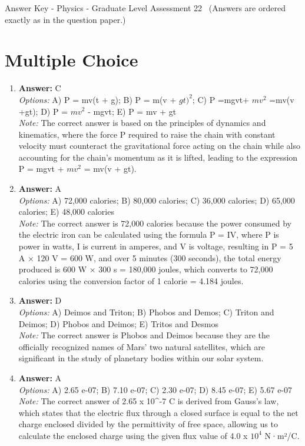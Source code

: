 \documentclass[12pt]{article}
\begin{document}
\begin{center}
Answer Key - Physics - Graduate Level Assessment 22 \
\small (Answers are ordered exactly as in the question paper.)
\end{center}

\section*{Multiple Choice}
\begin{enumerate}[label=\arabic*.]
\item \textbf{Answer:} C
\\ \textit{Options:} A) P = mv(t + g); B) P = m(v + $gt)^2$; C) P =mgvt+ $mv^2$ =mv(v +gt); D) P = $mv^2$ - mgvt; E) P = mv + gt
\\ \textit{Note:} The correct answer is based on the principles of dynamics and kinematics, where the force P required to raise the chain with constant velocity must counteract the gravitational force acting on the chain while also accounting for the chain's momentum as it is lifted, leading to the expression P = mgvt + $mv^2$ = mv(v + gt).
\item \textbf{Answer:} A
\\ \textit{Options:} A) 72,000 calories; B) 80,000 calories; C) 36,000 calories; D) 65,000 calories; E) 48,000 calories
\\ \textit{Note:} The correct answer is 72,000 calories because the power consumed by the electric iron can be calculated using the formula P = IV, where P is power in watts, I is current in amperes, and V is voltage, resulting in P = 5 A × 120 V = 600 W, and over 5 minutes (300 seconds), the total energy produced is 600 W × 300 s = 180,000 joules, which converts to 72,000 calories using the conversion factor of 1 calorie = 4.184 joules.
\item \textbf{Answer:} D
\\ \textit{Options:} A) Deimos and Triton; B) Phobos and Demos; C) Triton and Deimos; D) Phobos and Deimos; E) Tritos and Desmos
\\ \textit{Note:} The correct answer is Phobos and Deimos because they are the officially recognized names of Mars' two natural satellites, which are significant in the study of planetary bodies within our solar system.
\item \textbf{Answer:} A
\\ \textit{Options:} A) 2.65 e-07; B) 7.10 e-07; C) 2.30 e-07; D) 8.45 e-07; E) 5.67 e-07
\\ \textit{Note:} The correct answer of 2.65 x 10^-7 C is derived from Gauss's law, which states that the electric flux through a closed surface is equal to the net charge enclosed divided by the permittivity of free space, allowing us to calculate the enclosed charge using the given flux value of 4.0 x $10^4$ N·m²/C.

\end{enumerate}
\end{document}
